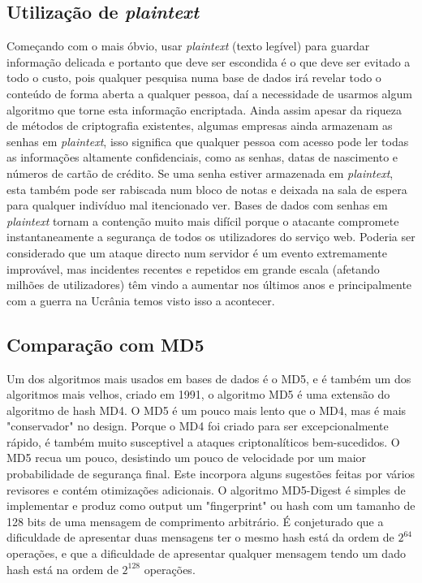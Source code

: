 \documentclass[conference]{IEEEtran}
\begin{document}
\subsection{Utilização de \textit{plaintext}}

Começando com o mais óbvio, usar \textit{plaintext} (texto legível) para guardar informação delicada e 
portanto que deve ser escondida é o que deve ser evitado a todo o custo, pois 
qualquer pesquisa numa base de dados irá revelar todo o conteúdo de forma aberta 
a qualquer pessoa, daí a necessidade de usarmos algum algoritmo que torne esta 
informação encriptada. Ainda assim apesar da riqueza de métodos de criptografia 
existentes, algumas empresas ainda armazenam as senhas em \textit{plaintext}, isso significa 
que qualquer pessoa com acesso pode ler todas as informações altamente confidenciais, 
como as senhas, datas de nascimento e números de cartão de crédito. 
Se uma senha estiver armazenada em \textit{plaintext}, esta também pode ser rabiscada num bloco de notas e 
deixada na sala de espera para qualquer indivíduo mal itencionado ver. Bases de dados com 
senhas em \textit{plaintext} tornam a contenção muito mais difícil porque o atacante compromete 
instantaneamente a segurança de todos os utilizadores do serviço web. Poderia ser 
considerado que um ataque directo num servidor é um evento extremamente improvável, 
mas incidentes recentes e repetidos em grande escala (afetando milhões de utilizadores) 
têm vindo a aumentar nos últimos anos \cite{ashley2022cyber} e principalmente com a 
guerra na Ucrânia temos visto isso a acontecer.

\subsection{Comparação com MD5}

Um dos algoritmos mais usados em bases de dados é o MD5, e é também um dos algoritmos mais velhos, 
criado em 1991, o algoritmo MD5 é uma extensão do algoritmo de hash MD4. O MD5 é um pouco 
mais lento que o MD4, mas é mais "conservador" no design. Porque o MD4 foi criado para ser 
excepcionalmente rápido, é também muito susceptivel a ataques criptonalíticos bem-sucedidos. 
O MD5 recua um pouco, desistindo um pouco de velocidade por um maior probabilidade de segurança final. 
Este incorpora alguns sugestões feitas por vários revisores e contém otimizações adicionais. 
O algoritmo MD5-Digest é simples de implementar e produz como output um "fingerprint" ou hash com um tamanho de 128 bits
de uma mensagem de comprimento arbitrário. É conjeturado que a dificuldade de apresentar duas mensagens 
ter o mesmo hash está da ordem de $2^{64}$ operações, e que a dificuldade de apresentar qualquer mensagem 
tendo um dado hash está na ordem de $2^{128}$ operações. \cite{rfc1321}
\end{document}
